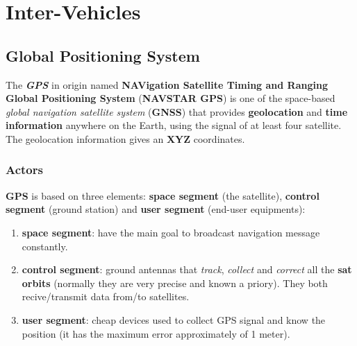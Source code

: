 \chapter{Inter-Vehicles}

\section{Global Positioning System}
The \textbf{\textit{GPS}} in origin named \textbf{NAVigation Satellite Timing and Ranging Global Positioning System} (\textbf{NAVSTAR GPS}) is one of the space-based \textit{global navigation satellite system} (\textbf{GNSS}) that provides \textbf{geolocation} and \textbf{time information} anywhere on the Earth, using the signal of at least four satellite. The geolocation information gives an \textbf{XYZ} coordinates.

\subsection{Actors}
\textbf{GPS} is based on three elements: \textbf{space segment} (the satellite), \textbf{control segment} (ground station) and \textbf{user segment} (end-user equipments):
\begin{enumerate}[nosep]
    \item \textbf{space segment}: have the main goal to broadcast navigation message constantly.
    \item \textbf{control segment}: ground antennas that \textit{track}, \textit{collect} and \textit{correct} all the \textbf{sat orbits} (normally they are very precise and known a priory). They both recive/transmit data from/to satellites.
    \item \textbf{user segment}: cheap devices used to collect GPS signal and know the position (it has the maximum error approximately of 1 meter).
\end{enumerate}

